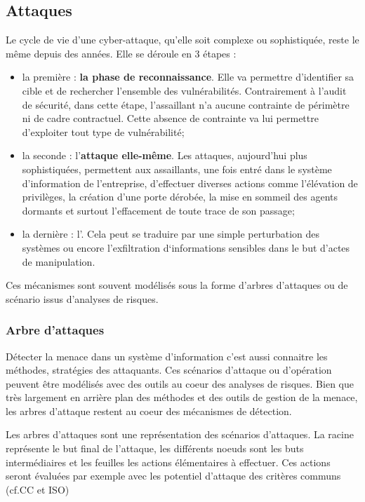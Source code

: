 \subsection{Attaques}

Le cycle de vie d’une cyber-attaque, qu’elle soit complexe ou sophistiquée, reste le même depuis des années. Elle se déroule en 3 étapes :
\begin{itemize}
  \item la première : \textbf{la phase de reconnaissance}. Elle va permettre d’identifier sa cible et de rechercher l’ensemble des vulnérabilités. Contrairement à l’audit de sécurité, dans cette étape, l’assaillant n’a aucune contrainte de périmètre ni de cadre contractuel. Cette absence de contrainte va lui permettre d’exploiter tout type de vulnérabilité;
  \item la seconde : l’\textbf{attaque elle-même}. Les attaques, aujourd’hui plus sophistiquées, permettent aux assaillants, une fois entré dans le système d’information de l’entreprise, d’effectuer diverses actions comme l’élévation de privilèges, la création d’une porte dérobée, la mise en sommeil des agents dormants et surtout l’effacement de toute trace de son passage;
  \item  la dernière : l’. Cela peut se traduire par une simple perturbation des systèmes ou encore l’exfiltration d‘informations sensibles dans le but d’actes de manipulation.
\end{itemize}

Ces mécanismes sont souvent modélisés sous la forme d'arbres d'attaques ou de scénario issus d'analyses de risques.

\subsubsection{Arbre d'attaques} \label{ref_arbre_attaques}


Détecter la menace dans un système d'information c'est aussi connaitre les méthodes, stratégies des attaquants. Ces scénarios d'attaque ou d'opération peuvent être modélisés avec des outils au coeur des analyses de risques. Bien que très largement en arrière plan des méthodes et des outils de gestion de la menace, les arbres d'attaque restent au coeur des mécanismes de détection.

Les arbres d'attaques sont une représentation des scénarios d'attaques. La racine représente le but final de l'attaque, les différents noeuds sont les buts intermédiaires et les feuilles les actions élémentaires à effectuer. Ces actions seront évaluées par exemple avec les potentiel d'attaque des critères communs (cf.CC et ISO)

